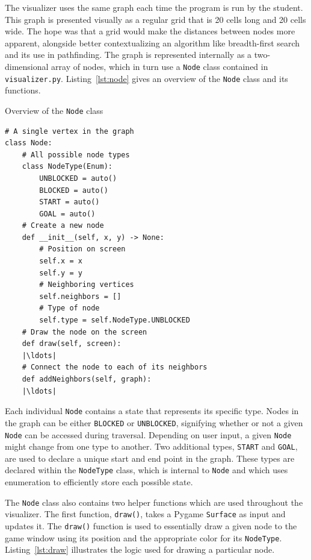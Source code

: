 \documentclass[pageno]{jpaper}
\begin{document}
The visualizer uses the same graph each time the program is run by the student. This graph is presented visually as a regular grid that is 20 cells long and 20 cells wide. The hope was that a grid would make the distances between nodes more apparent, alongside better contextualizing an algorithm like breadth-first search and its use in pathfinding. The graph is represented internally as a two-dimensional array of nodes, which in turn use a \texttt{Node} class contained in \texttt{visualizer.py}. Listing~\ref{lst:node} gives an overview of the \texttt{Node} class and its functions.

\begin{listing}[H]
\centering
\begin{minipage}{0.8\textwidth}%
\linespread{1.0}
\caption{Overview of the \texttt{Node} class}
\begin{verbatim}
# A single vertex in the graph
class Node:
	# All possible node types
	class NodeType(Enum):
		UNBLOCKED = auto()
		BLOCKED = auto()
		START = auto()
		GOAL = auto()
	# Create a new node
	def __init__(self, x, y) -> None:
		# Position on screen
		self.x = x
		self.y = y
		# Neighboring vertices
		self.neighbors = []
		# Type of node
		self.type = self.NodeType.UNBLOCKED
	# Draw the node on the screen
	def draw(self, screen):
	|\ldots|
	# Connect the node to each of its neighbors
	def addNeighbors(self, graph):
	|\ldots|
\end{verbatim}
\label{lst:node}
\end{minipage}
\end{listing}

Each individual \texttt{Node} contains a state that represents its specific type. Nodes in the graph can be either \texttt{BLOCKED} or \texttt{UNBLOCKED}, signifying whether or not a given \texttt{Node} can be accessed during traversal. Depending on user input, a given \texttt{Node} might change from one type to another. Two additional types, \texttt{START} and \texttt{GOAL}, are used to declare a unique start and end point in the graph. These types are declared within the \texttt{NodeType} class, which is internal to \texttt{Node} and which uses enumeration to efficiently store each possible state.

The \texttt{Node} class also contains two helper functions which are used throughout the visualizer. The first function, \texttt{draw()}, takes a Pygame \texttt{Surface} as input and updates it. The \texttt{draw()} function is used to essentially draw a given node to the game window using its position and the appropriate color for its \texttt{NodeType}. Listing~\ref{lst:draw} illustrates the logic used for drawing a particular node.
\end{document}
